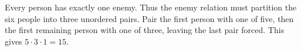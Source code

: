 Every person has exactly one enemy. Thus the enemy relation must partition the six people into three unordered pairs. Pair the first person with one of five, then the first remaining person with one of three, leaving the last pair forced. This gives $5\cdot 3\cdot 1=\boxed{15}$.
